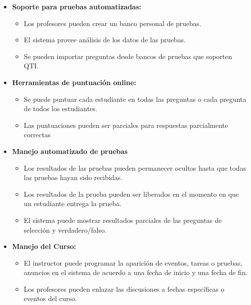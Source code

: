 	\begin{itemize}
		\item \textbf{Soporte para pruebas automatizadas:}
			\begin{itemize}
				\item Los profesores pueden crear un banco personal de pruebas.
				\item El sistema provee análisis de los datos de las pruebas.
				\item Se pueden importar preguntas desde bancos de pruebas que soporten QTI.
			\end{itemize}
	\end{itemize}
	\begin{itemize}
		\item \textbf{Herramientas de puntuación online:}
		\begin{itemize}
			\item Se puede puntuar cada estudiante en todas las preguntas o cada pregunta de todos los estudiantes.
			\item Las puntuaciones pueden ser parciales para respuestas parcialmente correctas
		\end{itemize}
	\end{itemize}
	\begin{itemize}
		\item \textbf{Manejo automatizado de pruebas}
			\begin{itemize}
				\item Los resultados de las pruebas pueden permanecer ocultos hasta que todas las pruebas hayan sido recibidas.
				\item Los resultados de la prueba pueden ser liberados en el momento en que un estudiante entrega la prueba.
				\item El sistema puede mostrar resultados parciales de  las preguntas de selección y verdadero/falso.
			\end{itemize}
	\end{itemize}
	\begin{itemize}
		\item \textbf{Manejo del Curso:}
			\begin{itemize}
				\item El instructor puede programar la aparición de eventos, tareas o pruebas, anuncios en el sistema de acuerdo a una fecha de inicio y una fecha de fin.
				\item Los profesores pueden enlazar las discusiones a fechas específicas o eventos del curso.
			\end{itemize}
	\end{itemize}
